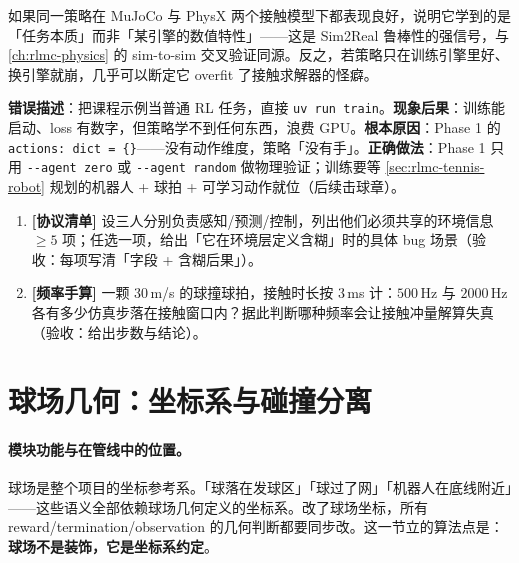 \begin{insight}[双引擎都跑得好 = 策略学到了任务本质]\label{ins:rlmc-tennis-sim2sim}
如果同一策略在 MuJoCo 与 PhysX 两个接触模型下都表现良好，说明它学到的是「任务本质」而非「某引擎的数值特性」——这是 Sim2Real 鲁棒性的强信号，与 \cref{ch:rlmc-physics} 的 sim-to-sim 交叉验证同源。反之，若策略只在训练引擎里好、换引擎就崩，几乎可以断定它 overfit 了接触求解器的怪癖。
\end{insight}

\begin{pitfall}
\textbf{错误描述}：把课程示例当普通 RL 任务，直接 \verb|uv run train|。\textbf{现象后果}：训练能启动、loss 有数字，但策略学不到任何东西，浪费 GPU。\textbf{根本原因}：Phase 1 的 \verb|actions: dict = {}|——没有动作维度，策略「没有手」。\textbf{正确做法}：Phase 1 只用 \verb|--agent zero| 或 \verb|--agent random| 做物理验证；训练要等 \cref{sec:rlmc-tennis-robot} 规划的机器人 + 球拍 + 可学习动作就位（后续击球章）。
\end{pitfall}

\begin{practice}[本节动手任务]
\begin{enumerate}
  \item \textbf{[协议清单]} 设三人分别负责感知/预测/控制，列出他们必须共享的环境信息 $\ge 5$ 项；任选一项，给出「它在环境层定义含糊」时的具体 bug 场景（验收：每项写清「字段 + 含糊后果」）。
  \item \textbf{[频率手算]} 一颗 $30$\,m/s 的球撞球拍，接触时长按 $3$\,ms 计：$500$\,Hz 与 $2000$\,Hz 各有多少仿真步落在接触窗口内？据此判断哪种频率会让接触冲量解算失真（验收：给出步数与结论）。
\end{enumerate}
\end{practice}

\section{球场几何：坐标系与碰撞分离}
\label{sec:rlmc-tennis-court}

\paragraph{模块功能与在管线中的位置。}球场是整个项目的坐标参考系。「球落在发球区」「球过了网」「机器人在底线附近」——这些语义全部依赖球场几何定义的坐标系。改了球场坐标，所有 reward/termination/observation 的几何判断都要同步改。这一节立的算法点是：\textbf{球场不是装饰，它是坐标系约定}。

